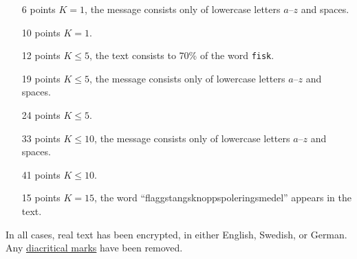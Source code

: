 \begin{enumerate}
	\item[6 points] $K = 1$, the message consists only of lowercase letters $a$--$z$ and spaces.
	\item[10 points] $K = 1$.
  \item[12 points] $K \le 5$, the text consists to 70\% of the word \texttt{fisk}.
	\item[19 points] $K \le 5$, the message consists only of lowercase letters $a$--$z$ and spaces.
  \item[24 points] $K \le 5$.
	\item[33 points] $K \le 10$, the message consists only of lowercase letters $a$--$z$ and spaces.
  \item[41 points] $K \le 10$.
	\item[15 points] $K = 15$, the word ``flaggstangsknoppspoleringsmedel'' appears in the text.
\end{enumerate}

In all cases, real text has been encrypted, in either English, Swedish, or German. Any \href{https://en.wikipedia.org/wiki/Diacritics}{diacritical marks} have been removed.
